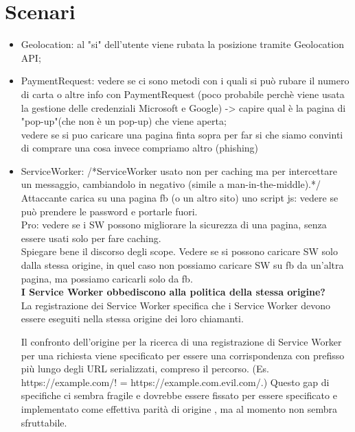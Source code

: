 \documentclass[italian]{article}
\begin{document}
\section{Scenari}
\begin{itemize}
\item Geolocation: al "si" dell'utente viene rubata la posizione tramite Geolocation API;
\\
\item PaymentRequest: vedere se ci sono metodi con i quali si può rubare il numero di carta o altre info con PaymentRequest (poco probabile perchè viene usata la gestione delle credenziali Microsoft e Google) -> capire qual è la pagina di "pop-up"(che non è un pop-up) che viene aperta;
\\
vedere se si puo caricare una pagina finta sopra per far si che siamo convinti di comprare una cosa invece compriamo altro (phishing)
\\
\item ServiceWorker: /*ServiceWorker usato non per caching ma per intercettare un messaggio, cambiandolo in negativo (simile a man-in-the-middle).*/
\\
Attaccante carica su una pagina fb (o un altro sito) uno script js: vedere se può prendere le password e portarle fuori.
\\
Pro: vedere se i SW possono migliorare la sicurezza di una pagina, senza essere usati solo per fare caching.
\\
Spiegare bene il discorso degli scope.
Vedere se si possono caricare SW solo dalla stessa origine, in quel caso non possiamo caricare SW su fb da un'altra pagina, ma possiamo caricarli solo da fb.
\\
\textbf{I Service Worker obbediscono alla politica della stessa origine?}
\\
La registrazione dei Service Worker specifica che i Service Worker devono essere eseguiti nella stessa origine dei loro chiamanti.

Il confronto dell'origine per la ricerca di una registrazione di Service Worker per una richiesta viene specificato per essere una corrispondenza con prefisso più lungo degli URL serializzati, compreso il percorso. (Es. https://example.com/! = https://example.com.evil.com/.) 
Questo gap di specifiche ci sembra fragile e dovrebbe essere fissato per essere specificato e implementato come effettiva parità di origine , ma al momento non sembra sfruttabile.


\end{itemize}
\end{document}

